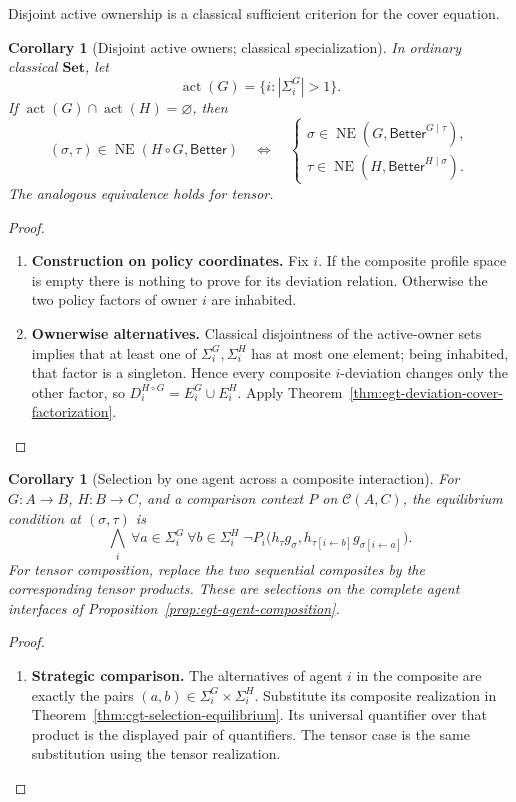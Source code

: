 \documentclass[11pt,a4paper]{article}
\numberwithin{equation}{section}
\newtheorem{corollary}[theorem]{Corollary}
\theoremstyle{definition}
\theoremstyle{remark}
\theoremstyle{plain}
\begin{document}
Disjoint active ownership is a classical sufficient
criterion for the cover equation.

\begin{corollary}[Disjoint active owners; classical specialization]
\label{thm:egt-disjoint}
In ordinary classical $\mathbf{Set}$, let
\[
 \operatorname{act}(G)=\{i:|\Sigma_i^G|>1\}.
\]
If
$\operatorname{act}(G)\cap\operatorname{act}(H)=\varnothing$, then
\[
 (\sigma,\tau)\in\operatorname{NE}(H\circ G,\mathsf{Better})
 \quad\Longleftrightarrow\quad
 \begin{cases}
 \sigma\in\operatorname{NE}
      (G,\mathsf{Better}^{G\mid\tau}),\\
 \tau\in\operatorname{NE}
      (H,\mathsf{Better}^{H\mid\sigma}).
 \end{cases}
\]
The analogous equivalence holds for tensor.
\end{corollary}
\begin{proof}
\leavevmode
\begin{enumerate}[label=\textup{(\arabic*)},leftmargin=*,itemsep=4pt,topsep=3pt]
  \item \textbf{Construction on policy coordinates.} Fix $i$. If the composite profile space is empty there is nothing to prove
for its deviation relation. Otherwise the two policy factors of owner $i$
are inhabited.
  \item \textbf{Ownerwise alternatives.} Classical disjointness of the active-owner sets implies that
at least one of $\Sigma_i^G,\Sigma_i^H$ has at most one element; being
inhabited, that factor is a singleton. Hence every composite $i$-deviation
changes only the other factor, so
$D_i^{H\circ G}=E_i^G\cup E_i^H$. Apply
Theorem~\ref{thm:egt-deviation-cover-factorization}.
\end{enumerate}
\end{proof}

\begin{corollary}[Selection by one agent across a composite interaction]
\label{cor:egt-agent-composite-selection}
For $G:A\to B$, $H:B\to C$, and a comparison context $P$ on
$\mathcal C(A,C)$, the equilibrium condition at $(\sigma,\tau)$ is
\[
 \bigwedge_i\ \forall a\in\Sigma_i^G\ \forall b\in\Sigma_i^H\;
 \neg P_i\bigl(h_\tau g_\sigma,
      h_{\tau[i\leftarrow b]}g_{\sigma[i\leftarrow a]}\bigr).
\]
For tensor composition, replace the two sequential composites by the
corresponding tensor products. These are selections on the complete agent
interfaces of Proposition~\ref{prop:egt-agent-composition}.
\end{corollary}
\begin{proof}
\leavevmode
\begin{enumerate}[label=\textup{(\arabic*)},leftmargin=*,itemsep=4pt,topsep=3pt]
  \item \textbf{Strategic comparison.} The alternatives of agent $i$ in the composite are exactly the pairs
$(a,b)\in\Sigma_i^G\times\Sigma_i^H$. Substitute its composite realization
in Theorem~\ref{thm:cgt-selection-equilibrium}. Its universal quantifier
over that product is the displayed pair of quantifiers. The tensor case is
the same substitution using the tensor realization.
\end{enumerate}
\end{proof}
\end{document}
